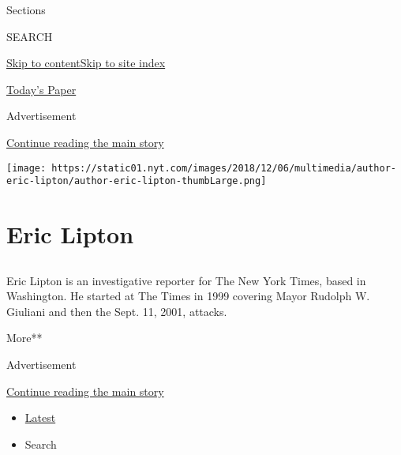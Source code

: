 Sections

SEARCH

\protect\hyperlink{site-content}{Skip to
content}\protect\hyperlink{site-index}{Skip to site index}

\href{https://myaccount.nytimes.com/auth/login?response_type=cookie\&client_id=vi}{}

\href{https://www.nytimes.com/section/todayspaper}{Today's Paper}

Advertisement

\protect\hyperlink{after-top}{Continue reading the main story}

\texttt{[image: https://static01.nyt.com/images/2018/12/06/multimedia/author-eric-lipton/author-eric-lipton-thumbLarge.png]}

\hypertarget{eric-lipton}{%
\section{Eric Lipton}\label{eric-lipton}}

\subsection{}

Eric Lipton is an investigative reporter for The New York Times, based
in Washington. He started at The Times in 1999 covering Mayor Rudolph W.
Giuliani and then the Sept. 11, 2001, attacks.

More**

Advertisement

\protect\hyperlink{after-mid1}{Continue reading the main story}

\begin{itemize}
\tightlist
\item
  \protect\hyperlink{stream-panel}{Latest}
\item
  Search
\end{itemize}

